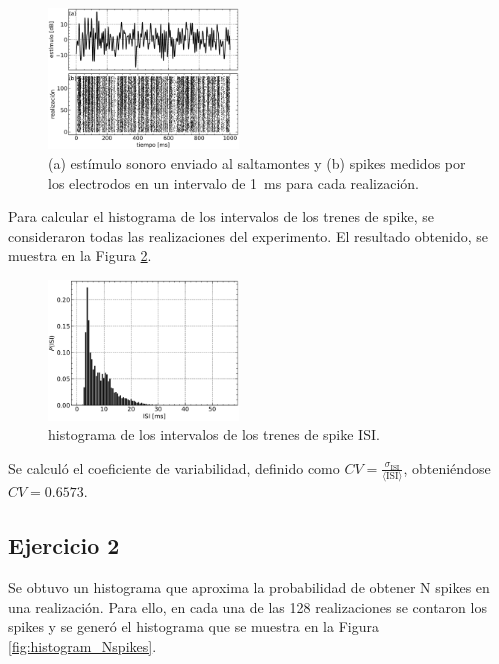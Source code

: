 \documentclass[11pt, twocolumn]{article}
\begin{document}
\begin{figure} [htbp]
    \centering
    \includegraphics[width=0.45\textwidth]{figures/estimu_spikes.pdf}
    \caption{(a) estímulo sonoro enviado al saltamontes y (b) spikes medidos por los electrodos en un intervalo de \SI{1}{\milli\second} para cada realización.}
    \label{fig:estimulo_spikes}
\end{figure}


Para calcular el histograma de los intervalos de los trenes de spike, se consideraron todas las realizaciones del experimento. El resultado obtenido, se muestra en la Figura \ref{fig:histogram_ISI}.

\begin{figure} [htbp]
    \centering
    \includegraphics[width=0.45\textwidth]{figures/ISI.pdf}
    \caption{histograma de los intervalos de los trenes de spike ISI.}
    \label{fig:histogram_ISI}
\end{figure}


Se calculó el coeficiente de variabilidad, definido como \(CV = \frac{\sigma_\text{ISI}}{\langle \text{ISI} \rangle}\), obteniéndose \(CV = 0.6573\).

\subsection*{Ejercicio 2}
Se obtuvo un histograma que aproxima la probabilidad de obtener N spikes en una realización. Para ello, en cada una de las 128 realizaciones se contaron los spikes y se generó el histograma que se muestra en la Figura \ref{fig:histogram_Nspikes}.
\end{document}
